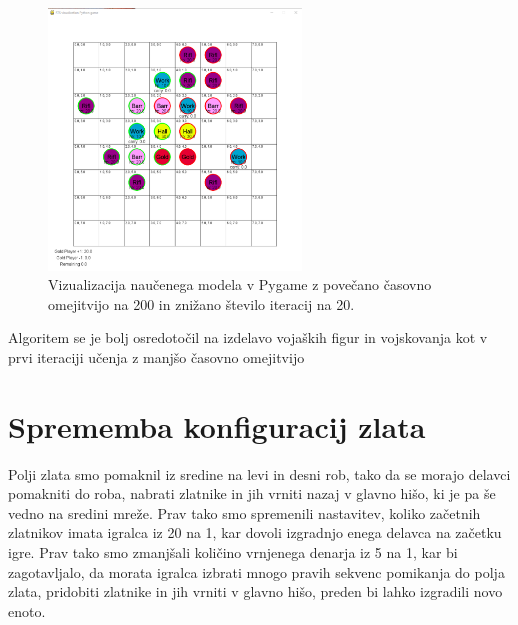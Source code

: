 \documentclass[a4paper, 12pt]{book}
\begin{document}
\begin{figure}[h]
	\begin{center}
		\includegraphics[width=0.6\textwidth]{photos/second-2018-11-12.pdf}
	\end{center}
	\caption{Vizualizacija naučenega modela v Pygame z povečano časovno omejitvijo  na 200 in znižano število iteracij na 20.}
	\label{vizualizacijaRezultatov200timeout20Iters}
\end{figure}

Algoritem se je bolj osredotočil na izdelavo vojaških figur in vojskovanja kot v prvi iteraciji učenja z manjšo časovno omejitvijo


\section{Sprememba konfiguracij zlata}
\label{resultThird}

Polji zlata smo pomaknil iz sredine na levi in desni rob, tako da se morajo delavci pomakniti do roba, nabrati zlatnike in jih vrniti nazaj v glavno hišo, ki je pa še vedno na sredini mreže.
Prav tako smo spremenili nastavitev, koliko začetnih zlatnikov imata igralca iz 20 na 1, kar dovoli izgradnjo enega delavca na začetku igre.
Prav tako smo zmanjšali količino vrnjenega denarja iz 5 na 1, kar bi zagotavljalo, da morata igralca izbrati mnogo pravih sekvenc pomikanja do polja zlata, pridobiti zlatnike in jih vrniti v glavno hišo, preden bi lahko izgradili novo enoto.
\end{document}
